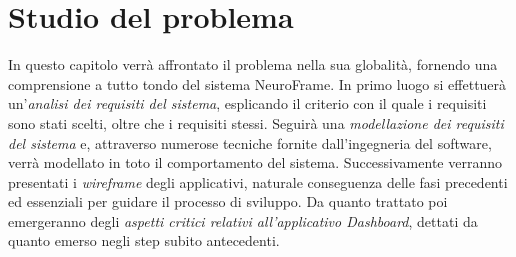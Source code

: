 \chapter{Studio del problema}
In questo capitolo verrà affrontato il problema nella sua globalità, fornendo una comprensione a tutto tondo del sistema NeuroFrame.\newline
In primo luogo si effettuerà un'\emph{analisi dei requisiti del sistema}, esplicando il criterio con il quale i requisiti sono stati scelti, oltre che i requisiti stessi.\newline
Seguirà una \emph{modellazione dei requisiti del sistema} e, attraverso numerose tecniche fornite dall'ingegneria del software, verrà modellato in toto il comportamento del sistema.\newline
Successivamente verranno presentati i \emph{wireframe} degli applicativi, naturale conseguenza delle fasi precedenti ed essenziali per guidare il processo di sviluppo.\newline
Da quanto trattato poi emergeranno degli \emph{aspetti critici relativi all'applicativo Dashboard}, dettati da quanto emerso negli step subito antecedenti.\newline
